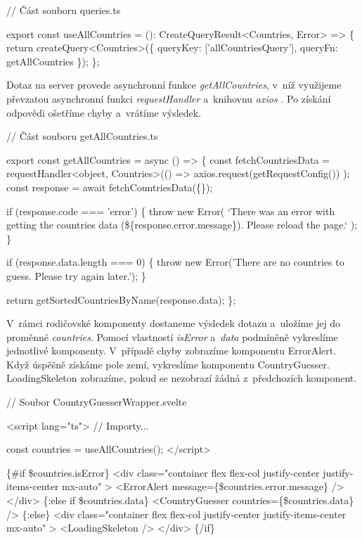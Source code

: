 \begin{prog}
// Část souboru queries.ts

export const useAllCountries = (): CreateQueryResult<Countries, Error> => \{
  return createQuery<Countries>(\{
    queryKey: ['allCountriesQuery'], queryFn: getAllCountries
  \});
\};
\end{prog}

Dotaz na server provede asynchronní funkce \emph{getAllCountries}, v~níž využijeme převzatou asynchronní funkci \emph{requestHandler} \cite{axiosrequesthandler} a~knihovnu \emph{axios} \cite{axioslib}. 
Po získání odpovědi ošetříme chyby a~vrátíme výsledek.

\begin{prog}
// Část souboru getAllCountries.ts

export const getAllCountries = async () => \{
  const fetchCountriesData = requestHandler<object, Countries>(() =>
    axios.request(getRequestConfig())
  );
  const response = await fetchCountriesData(\{\});

  if (response.code === 'error') \{
    throw new Error(
      `There was an error with getting the countries data 
      (\$\{response.error.message\}). Please reload the page.`
    );
  \}

  if (response.data.length === 0) \{
    throw new Error('There are no countries to guess. Please try again later.');
  \}

  return getSortedCountriesByName(response.data);
\};
\end{prog}

V~rámci rodičovské komponenty dostaneme výsledek dotazu a~uložíme jej do proměnné \emph{countries}. Pomocí vlastností \emph{isError} a~\emph{data} podmíněně vykreslíme jednotlivé komponenty. 
V~případě chyby zobrazíme komponentu ErrorAlert. Když úspěšně získáme pole zemí, vykreslíme komponentu CountryGuesser. LoadingSkeleton zobrazíme, pokud se nezobrazí žádná z~předchozích komponent.

\begin{prog}
// Soubor CountryGuesserWrapper.svelte

<script lang="ts">
  // Importy...

  const countries = useAllCountries();
</script>

\{#if \$countries.isError\}
  <div 
    class="container flex flex-col justify-center justify-items-center mx-auto"
  >
    <ErrorAlert message=\{\$countries.error.message\} />
  </div>
\{:else if \$countries.data\}
  <CountryGuesser countries=\{\$countries.data\} />
\{:else\}
  <div 
    class="container flex flex-col justify-center justify-items-center mx-auto"
  >
    <LoadingSkeleton />
  </div>
\{/if\}
\end{prog}

